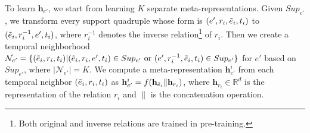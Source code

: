 \documentclass[runningheads]{llncs}
\begin{document}
To learn $\mathbf{h}_{e'}$, we start from learning $K$ separate 
meta-representations. Given $Sup_{e'}$, we transform every support quadruple whose form is
$(e',r_i,\Tilde{e}_i,t_i)$ to $(\Tilde{e}_i,r_i^{-1},e',t_i)$, where $r_i^{-1}$ denotes the 
inverse relation\footnote{Both original and inverse relations are trained in pre-training.}
of $r_i$. 
Then we create a temporal neighborhood 
$\mathcal{N}_{e'} = \{(\Tilde{e}_i, r_i, t_i)| (\Tilde{e}_i, r_i, e', t_i) \in Sup_{e'} \  \text{or} \  (e', r_i^{-1}, \Tilde{e}_i, t_i)\in Sup_{e'}\}$ for $e'$ based on $Sup_{e'}$, where $|\mathcal{N}_{e'}| = K$. We compute a meta-representation $\mathbf{h}_{e'}^{i}$ from each temporal neighbor $(\Tilde{e}_i, r_i, t_i)$ as $\mathbf{h}_{e'}^{i} = f(\mathbf{h}_{\Tilde{e}_i}\| \mathbf{h}_{r_i})$, where
$\mathbf{h}_{r_i} \in \mathbb{R}^d$ is the representation of the relation $r_i$ and $\|$ is the concatenation operation. 
\end{document}
